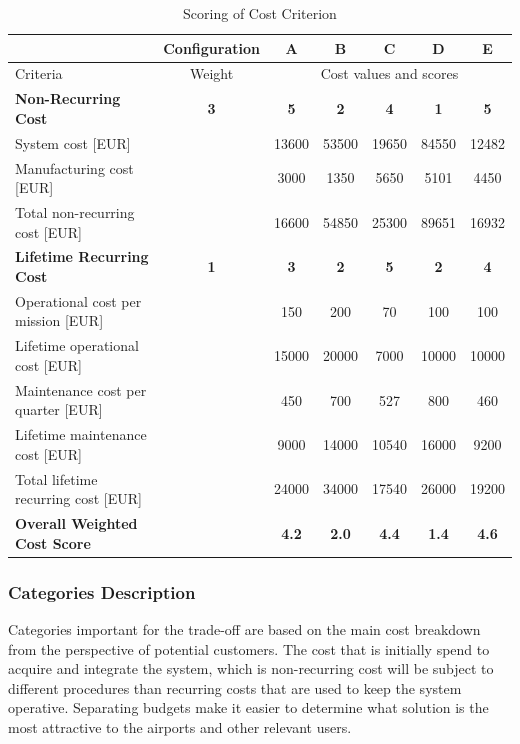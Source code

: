 \begin{table}[H]
    \centering
    \caption{Scoring of Cost Criterion}
    \begin{tabular}{lc|ccccc}
    \hline
         & Configuration & A & B & C & D & E \\ \hline
        Criteria & Weight & \multicolumn{5}{c}{Cost values and scores} \\ \hline

        \textbf{Non-Recurring Cost} & \textbf{3} & \textbf{5} & \textbf{2} & \textbf{4} & \textbf{1} & \textbf{5} \\
        \quad System cost [EUR] & & 13600 & 53500 & 19650 & 84550 & 12482 \\
        \quad Manufacturing cost [EUR] & & 3000 & 1350 & 5650 & 5101 & 4450 \\
        \quad Total non-recurring cost [EUR] & & 16600 & 54850 & 25300 & 89651 & 16932 \\ \hline

        \textbf{Lifetime Recurring Cost} & \textbf{1} & \textbf{3} & \textbf{2} & \textbf{5} & \textbf{2} & \textbf{4} \\
        \quad Operational cost per mission [EUR] & & 150 & 200 & 70 & 100 & 100 \\
        \quad Lifetime operational cost [EUR] & & 15000 & 20000 & 7000 & 10000 & 10000 \\
        \quad Maintenance cost per quarter [EUR] & & 450 & 700 & 527 & 800 & 460 \\
        \quad Lifetime maintenance cost [EUR] & & 9000 & 14000 & 10540 & 16000 & 9200 \\
        \quad Total lifetime recurring cost [EUR] & & 24000 & 34000 & 17540 & 26000 & 19200 \\ \hline

        \textbf{Overall Weighted Cost Score} & & \textbf{4.2} & \textbf{2.0} & \textbf{4.4} & \textbf{1.4} & \textbf{4.6} \\ \hline
    \end{tabular}
    \label{tab:cost-criterion-scoring}
\end{table}


\subsubsection*{Categories Description}
Categories important for the trade-off are based on the main cost breakdown from the perspective of potential customers. The cost that is initially spend to acquire and integrate the system, which is non-recurring cost will be subject to different procedures than recurring costs that are used to keep the system operative. Separating budgets make it easier to determine what solution is the most attractive to the airports and other relevant users.

